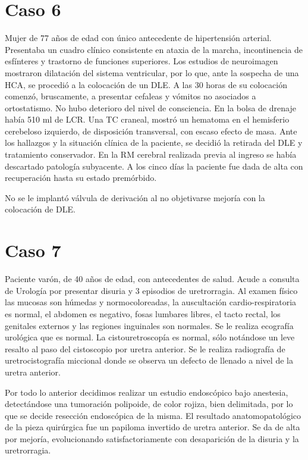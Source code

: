 \section{Caso 6}\label{anexo:texto_caso_6}

Mujer de 77 años de edad con único antecedente de hipertensión arterial. Presentaba un cuadro
clínico consistente en ataxia de la marcha, incontinencia de esfínteres y trastorno de funciones
superiores. Los estudios de neuroimagen mostraron dilatación del sistema ventricular, por lo que,
ante la sospecha de una HCA, se procedió a la colocación de un DLE. A las 30 horas de su colocación
comenzó, bruscamente, a presentar cefaleas y vómitos no asociados a ortostatismo. No hubo deterioro
del nivel de consciencia. En la bolsa de drenaje había 510 ml de LCR. Una TC craneal, mostró un
hematoma en el hemisferio cerebeloso izquierdo, de disposición transversal, con escaso efecto de
masa. Ante los hallazgos y la situación clínica de la paciente, se decidió la retirada del DLE y
tratamiento conservador. En la RM cerebral realizada previa al ingreso se había descartado
patología subyacente. A los cinco días la paciente fue dada de alta con recuperación hasta su
estado premórbido.

No se le implantó válvula de derivación al no objetivarse mejoría con la colocación de DLE.

\section{Caso 7}\label{anexo:texto_caso_7}

Paciente varón, de 40 años de edad, con antecedentes de salud. Acude a consulta de Urología por
presentar disuria y 3 episodios de uretrorragia. Al examen físico las mucosas son húmedas y
normocoloreadas, la auscultación cardio-respiratoria es normal, el abdomen es negativo, fosas
lumbares libres, el tacto rectal, los genitales externos y las regiones inguinales son normales. Se
le realiza ecografía urológica que es normal. La cistouretroscopía es normal, sólo notándose un
leve resalto al paso del cistoscopio por uretra anterior. Se le realiza radiografía de
uretrocistografía miccional donde se observa un defecto de llenado a nivel de la uretra anterior.

Por todo lo anterior decidimos realizar un estudio endoscópico bajo anestesia, detectándose una
tumoración polipoide, de color rojiza, bien delimitada, por lo que se decide resección endoscópica
de la misma. El resultado anatomopatológico de la pieza quirúrgica fue un papiloma invertido de
uretra anterior. Se da de alta por mejoría, evolucionando satisfactoriamente con desaparición de la
disuria y la uretrorragia.

